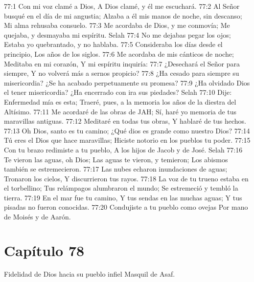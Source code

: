 77:1 Con mi voz clamé a Dios, 
A Dios clamé, y él me escuchará. 
77:2 Al Señor busqué en el día de mi angustia; 
Alzaba a él mis manos de noche, sin descanso; 
Mi alma rehusaba consuelo. 
77:3 Me acordaba de Dios, y me conmovía; 
Me quejaba, y desmayaba mi espíritu. Selah 
77:4 No me dejabas pegar los ojos; 
Estaba yo quebrantado, y no hablaba. 
77:5 Consideraba los días desde el principio, 
Los años de los siglos. 
77:6 Me acordaba de mis cánticos de noche; 
Meditaba en mi corazón, 
Y mi espíritu inquiría: 
77:7 ¿Desechará el Señor para siempre, 
Y no volverá más a sernos propicio? 
77:8 ¿Ha cesado para siempre su misericordia? 
¿Se ha acabado perpetuamente su promesa? 
77:9 ¿Ha olvidado Dios el tener misericordia? 
¿Ha encerrado con ira sus piedades? Selah 
77:10 Dije: Enfermedad mía es esta; 
Traeré, pues, a la memoria los años de la diestra del Altísimo. 
77:11 Me acordaré de las obras de JAH; 
Sí, haré yo memoria de tus maravillas antiguas. 
77:12 Meditaré en todas tus obras, 
Y hablaré de tus hechos. 
77:13 Oh Dios, santo es tu camino; 
¿Qué dios es grande como nuestro Dios? 
77:14 Tú eres el Dios que hace maravillas; 
Hiciste notorio en los pueblos tu poder. 
77:15 Con tu brazo redimiste a tu pueblo, 
A los hijos de Jacob y de José. Selah 
77:16 Te vieron las aguas, oh Dios; 
Las aguas te vieron, y temieron; 
Los abismos también se estremecieron. 
77:17 Las nubes echaron inundaciones de aguas; 
Tronaron los cielos, 
Y discurrieron tus rayos. 
77:18 La voz de tu trueno estaba en el torbellino; 
Tus relámpagos alumbraron el mundo; 
Se estremeció y tembló la tierra. 
77:19 En el mar fue tu camino, 
Y tus sendas en las muchas aguas; 
Y tus pisadas no fueron conocidas. 
77:20 Condujiste a tu pueblo como ovejas 
Por mano de Moisés y de Aarón. 
\section*{Capítulo 78}
Fidelidad de Dios hacia su pueblo infiel 
Masquil de Asaf. 
 
